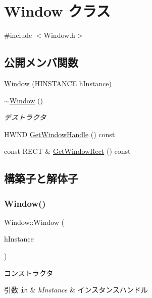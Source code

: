 \hypertarget{class_window}{}\section{Window クラス}
\label{class_window}


{\ttfamily \#include $<$Window.\+h$>$}

\subsection*{公開メンバ関数}
\begin{DoxyCompactItemize}
\item 
\mbox{\hyperlink{class_window_a49bb6150e2dea093b032330cab1d3cf3}{Window}} (H\+I\+N\+S\+T\+A\+N\+CE h\+Instance)
\item 
\mbox{\hyperlink{class_window_a245d821e6016fa1f6970ccbbedd635f6}{$\sim$\+Window}} ()
\begin{DoxyCompactList}\small\item\em デストラクタ \end{DoxyCompactList}\item 
H\+W\+ND \mbox{\hyperlink{class_window_a89ecd827044f54fcc43720b3d6ca731b}{Get\+Window\+Handle}} () const
\item 
const R\+E\+CT \& \mbox{\hyperlink{class_window_a3b03632363eef6f6f7366debe4576f17}{Get\+Window\+Rect}} () const
\end{DoxyCompactItemize}


\subsection{構築子と解体子}
\mbox{\label{class_window_a49bb6150e2dea093b032330cab1d3cf3}} 
\subsubsection{\texorpdfstring{Window()}{Window()}}
{\footnotesize\ttfamily Window\+::\+Window (\begin{DoxyParamCaption}\item[{H\+I\+N\+S\+T\+A\+N\+CE}]{h\+Instance }\end{DoxyParamCaption})}

コンストラクタ 
\begin{DoxyParams}[1]{引数}
\mbox{\tt in}  & {\em h\+Instance} & インスタンスハンドル \\
\hline
\end{DoxyParams}
\mbox{\label{class_window_a245d821e6016fa1f6970ccbbedd635f6}} 
